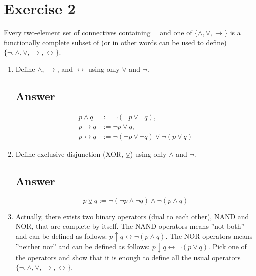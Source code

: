 \documentclass[12pt]{article}
\begin{document}
	
	\section*{Exercise 2}
	
	\noindent Every two-element set of connectives containing $\lnot$ and one of $\{\land, \lor, \to\}$ is a functionally complete subset of (or in other words can be used to define) $\{\lnot, \land, \lor, \to, \leftrightarrow\}$.
	
	\bigskip
	
	\begin{enumerate}[start=1,label={\bfseries Part \arabic*:},leftmargin=0in]
		\bigskip\item Define $\land$, $\to$, and $\leftrightarrow$ using only $\lor$ and $\lnot$.
		
		\subsection*{Answer}
		
			\[\boxed{
				\begin{aligned}
					p \land	q			& := \lnot ( \lnot p \lor \lnot q), \\
					p \to q				& := \lnot p \lor q, \\
					p \leftrightarrow q	& := \lnot ( \lnot p \lor \lnot q) \lor\lnot (p \lor q)
				\end{aligned}
			}\]
			
		\bigskip\item Define exclusive disjunction ($\text{XOR}$, $\veebar$) using only $\land$ and $\lnot$.
		
		\subsection*{Answer}
		
			\[\boxed{
				p \veebar q := \lnot ( \lnot p \land \lnot q) \land \lnot (p \land q)
			}\]
			
		\bigskip\item Actually, there exists two binary operators (dual to each other), $\text{NAND}$ and $\text{NOR}$, that are complete by itself. The $\text{NAND}$ operators means ”not both” and can be defined as follows: $p \uparrow q \leftrightarrow \lnot(p \land q)$. The $\text{NOR}$ operators means ”neither nor” and can be defined as follows: $p \downarrow q \leftrightarrow \lnot(p \lor q)$. Pick one of the operators and show that it is enough to define all the usual operators $\{\lnot, \land, \lor, \to, \leftrightarrow\}$.
		

\end{enumerate}
\end{document}
